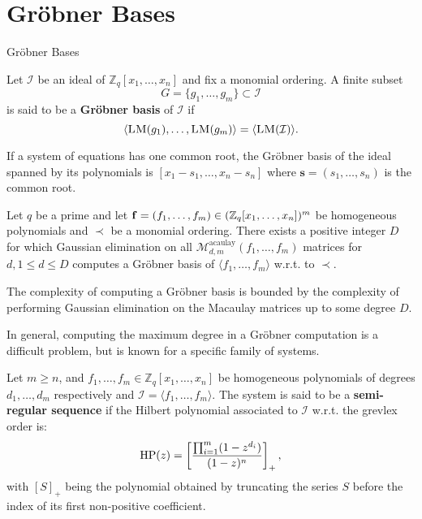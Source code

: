 \documentclass[10pt]{beamer}
\newcommand{\Zq}{\ensuremath{\mathbb{Z}_q}}
\newcommand{\id}{\mathcal{I}}
\newcommand{\Mac}[1]{\ensuremath{\mathcal{M}^{\mathrm{acaulay}}_{#1}}}
\newcommand{\ZqX}{\ensuremath{\mathbb{Z}_q}[x_1,\ldots,x_n]}
\newcommand{\LM}{\ensuremath{\textsc{LM}}\xspace}
\renewcommand{\vec}[1]{\mathbf{#1}\xspace}
\begin{document}
\section{Gröbner Bases}

\begin{frame}[allowframebreaks]{Gröbner Bases}

\begin{definition}
Let $\id$ be an ideal of $\ZqX$ and fix a monomial ordering. A finite subset $$G = \{g_1 ,\dots , g_{m} \} \subset \id$$  is said to be a \textbf{Gröbner basis} of $\id$ if
\[
\langle \LM(g_1), \dots , \LM(g_m)\rangle = \langle \LM(\id) \rangle.
\]
\end{definition}

\begin{block}{}
If a system of equations has one common root, the Gröbner basis of the ideal spanned by its polynomials is $[x_1 - s_1, \dots,  x_n - s_n]$ where $\vec{s} = (s_1, \dots, s_n)$ is the common root.
\end{block}


\framebreak

\begin{theorem}\label{theorem:lazard}
Let $q$ be a prime and let  ${\bf f}=(f_1 ,\ldots,f_{m}) \in (\Zq[x_1,\ldots,x_n])^m$ be homogeneous polynomials and $\prec$ be a monomial
ordering. There exists a positive integer $D$ for which Gaussian elimination on all $\Mac{d,m}(f_1 ,\ldots,f_{m})$ matrices for $d,1 \leq d \leq D$ computes a Gr\"obner basis of \(\langle f_1,\ldots,f_{m} \rangle\) w.r.t. to $\prec$.
\end{theorem}

\vspace{1em}

The complexity of computing a Gr\"obner basis is bounded by the complexity of performing Gaussian elimination on the Macaulay matrices up to some degree $D$.

\framebreak

In general, computing the maximum degree in a Gr\"obner computation is  
a difficult problem, but is known for a specific family of systems.


\begin{definition}\label{gen}
Let $m\geq n$, and $f_1 ,\ldots,f_{m} \in \Zq[x_1,\ldots,x_n] $ be homogeneous polynomials of degrees $d_{1},\ldots,d_{m}$ respectively and \(\id = \langle f_1,\dots,f_m\rangle\).
The system is said to be a {\bf semi-regular sequence} if the Hilbert polynomial  associated to \(\id\) w.r.t. the grevlex order is:
\begin{equation}\label{series}
 {\rm HP}(z) =\left[ \frac{ \prod_{i=1}^m(1-z^{d_i})}{(1-z)^{n}} \right]_{+},
\end{equation}
with \([S]_{+}\) being the polynomial obtained by truncating the series $S$ before the index of its first non-positive coefficient.
\end{definition}


\end{frame}
\end{document}
